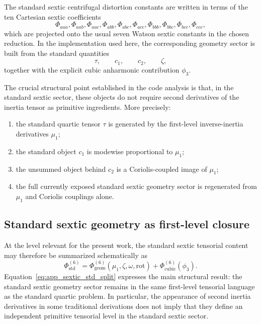 \documentclass[aip,jcp,reprint,floatfix]{revtex4-2}
\begin{document}
The standard sextic centrifugal distortion constants are written in terms of
the ten Cartesian sextic coefficients
\begin{equation}
\Phi_{aaa},\Phi_{aab},\Phi_{aac},\Phi_{abb},\Phi_{abc},
\Phi_{acc},\Phi_{bbb},\Phi_{bbc},\Phi_{bcc},\Phi_{ccc},
\end{equation}
which are projected onto the usual seven Watson sextic constants in the chosen
reduction. In the implementation used here, the corresponding geometry sector
is built from the standard quantities
\begin{equation}
\tau,\qquad c_1,\qquad c_2,\qquad \zeta,
\end{equation}
together with the explicit cubic anharmonic contribution $\phi_3$.

The crucial structural point established in the code analysis is that, in the
standard sextic sector, these objects do not require second derivatives of the
inertia tensor as primitive ingredients. More precisely:
\begin{enumerate}
\item the standard quartic tensor $\tau$ is generated by the first-level
inverse-inertia derivatives $\mu_1$;
\item the standard object $c_1$ is modewise proportional to $\mu_1$;
\item the unsummed object behind $c_2$ is a Coriolis-coupled image of $\mu_1$;
\item the full currently exposed standard sextic geometry sector is regenerated
from $\mu_1$ and Coriolis couplings alone.
\end{enumerate}

\subsection{Standard sextic geometry as first-level closure}

At the level relevant for the present work, the standard sextic tensorial
content may therefore be summarized schematically as
\begin{equation}
\Phi^{(6)}_{\mathrm{std}}
=
\Phi^{(6)}_{\mathrm{geom}}(\mu_1,\zeta,\omega,\mathrm{rot})
+
\Phi^{(6)}_{\mathrm{cubic}}(\phi_3).
\label{eq:app_sextic_std_split}
\end{equation}
Equation~\eqref{eq:app_sextic_std_split} expresses the main structural result:
the standard sextic geometry sector remains in the same first-level tensorial
language as the standard quartic problem. In particular, the appearance of
second inertia derivatives in some traditional derivations does not imply that
they define an independent primitive tensorial level in the standard sextic
sector.
\end{document}
